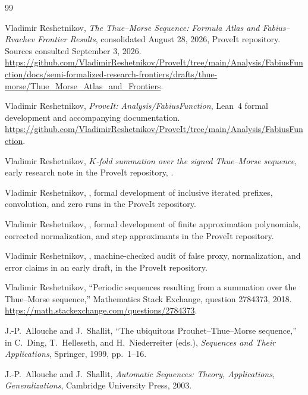 \documentclass[11pt,a4paper,oneside,openany]{book}
\numberwithin{equation}{chapter}
\theoremstyle{definition}
\theoremstyle{remark}
\begin{document}
\backmatter
\begin{thebibliography}{99}

Vladimir Reshetnikov, \emph{The Thue--Morse Sequence: Formula Atlas and
Fabius--Rvachev Frontier Results}, consolidated August 28, 2026, ProveIt
repository. Sources consulted September 3, 2026.
\url{https://github.com/VladimirReshetnikov/ProveIt/tree/main/Analysis/FabiusFunction/docs/semi-formalized-research-frontiers/drafts/thue-morse/Thue_Morse_Atlas_and_Frontiers}.

Vladimir Reshetnikov, \emph{ProveIt: Analysis/FabiusFunction}, Lean~4
formal development and accompanying documentation.
\url{https://github.com/VladimirReshetnikov/ProveIt/tree/main/Analysis/FabiusFunction}.

Vladimir Reshetnikov, \emph{$K$-fold summation over the signed Thue--Morse
sequence}, early research note in the ProveIt repository,
.

Vladimir Reshetnikov, , formal
development of inclusive iterated prefixes, convolution, and zero runs in
the ProveIt repository.

Vladimir Reshetnikov, ,
formal development of finite approximation polynomials, corrected
normalization, and step approximants in the ProveIt repository.

Vladimir Reshetnikov, ,
machine-checked audit of false proxy, normalization, and error claims in
an early draft, in the ProveIt repository.

Vladimir Reshetnikov, ``Periodic sequences resulting from a summation over
the Thue--Morse sequence,'' Mathematics Stack Exchange, question 2784373,
2018.
\url{https://math.stackexchange.com/questions/2784373}.

J.-P.~Allouche and J.~Shallit, ``The ubiquitous Prouhet--Thue--Morse
sequence,'' in C.~Ding, T.~Helleseth, and H.~Niederreiter (eds.),
\emph{Sequences and Their Applications}, Springer, 1999, pp.~1--16.

J.-P.~Allouche and J.~Shallit, \emph{Automatic Sequences: Theory,
Applications, Generalizations}, Cambridge University Press, 2003.


\end{thebibliography}
\end{document}
